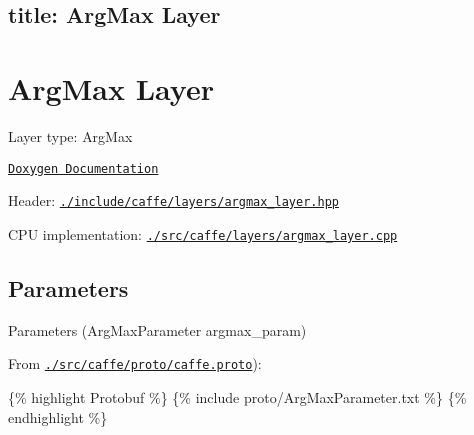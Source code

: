 

 \subsection*{title\+: Arg\+Max Layer }

\section*{Arg\+Max Layer}


\begin{DoxyItemize}
\item Layer type\+: {\ttfamily Arg\+Max}
\item \href{http://caffe.berkeleyvision.org/doxygen/classcaffe_1_1ArgMaxLayer.html}{\tt Doxygen Documentation}
\item Header\+: \href{https://github.com/BVLC/caffe/blob/master/include/caffe/layers/argmax_layer.hpp}{\tt {\ttfamily ./include/caffe/layers/argmax\+\_\+layer.hpp}}
\item C\+PU implementation\+: \href{https://github.com/BVLC/caffe/blob/master/src/caffe/layers/argmax_layer.cpp}{\tt {\ttfamily ./src/caffe/layers/argmax\+\_\+layer.cpp}}
\end{DoxyItemize}

\subsection*{Parameters}


\begin{DoxyItemize}
\item Parameters ({\ttfamily Arg\+Max\+Parameter argmax\+\_\+param})
\item From \href{https://github.com/BVLC/caffe/blob/master/src/caffe/proto/caffe.proto}{\tt {\ttfamily ./src/caffe/proto/caffe.proto}})\+:
\end{DoxyItemize}

\{\% highlight Protobuf \%\} \{\% include proto/\+Arg\+Max\+Parameter.\+txt \%\} \{\% endhighlight \%\} 